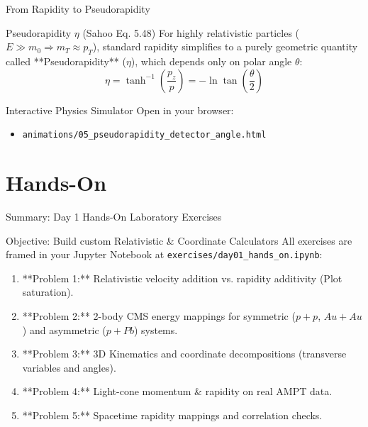 \documentclass[aspectratio=169]{beamer}
\begin{document}
\begin{frame}{From Rapidity to Pseudorapidity}
    \begin{block}{Pseudorapidity $\eta$ (Sahoo Eq. 5.48)}
        For highly relativistic particles ($E \gg m_0 \Rightarrow m_T \approx p_T$), standard rapidity simplifies to a purely geometric quantity called **Pseudorapidity** ($\eta$), which depends only on polar angle $\theta$:
        \[ \eta = \tanh^{-1}\left( \frac{p_z}{p} \right) = -\ln \tan \left( \frac{\theta}{2} \right) \]
    \end{block}
    \begin{alertblock}{Interactive Physics Simulator}
        Open in your browser:
        \begin{itemize}
            \item \texttt{animations/05\_pseudorapidity\_detector\_angle.html} 
        \end{itemize}
    \end{alertblock}
\end{frame}

\section{Hands-On}

\begin{frame}{Summary: Day 1 Hands-On Laboratory Exercises}
    \begin{block}{Objective: Build custom Relativistic \& Coordinate Calculators}
        All exercises are framed in your Jupyter Notebook at \texttt{exercises/day01\_hands\_on.ipynb}:
    \end{block}
    \begin{enumerate}
        \footnotesize
        \item **Problem 1:** Relativistic velocity addition vs. rapidity additivity (Plot saturation).
        \item **Problem 2:** 2-body CMS energy mappings for symmetric ($p+p$, $Au+Au$) and asymmetric ($p+Pb$) systems.
        \item **Problem 3:** 3D Kinematics and coordinate decompositions (transverse variables and angles).
        \item **Problem 4:** Light-cone momentum \& rapidity on real AMPT data.
        \item **Problem 5:** Spacetime rapidity mappings and correlation checks.
    \end{enumerate}
\end{frame}
\end{document}

